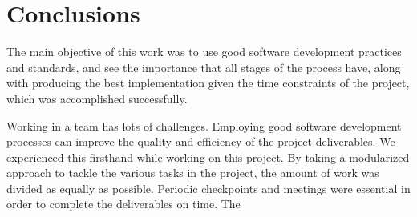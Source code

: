 \documentclass[12pt,a4paper]{article}
\begin{document}
%
%
%
%
%
%
%
%
%
%
%
%
%
%
%
%
%


%			
%
%

\clearpage

\section{Conclusions}

The main objective of this work was to use good software development practices and standards, and see the importance that all stages of the process have, along with producing the best implementation given the time constraints of the project, which was accomplished successfully. 

Working in a team has lots of challenges. Employing good software development processes can improve the quality and efficiency of the project deliverables. We experienced this firsthand while working on this project. By taking a modularized approach to tackle the various tasks in the project, the amount of work was divided as equally as possible. Periodic checkpoints and meetings were essential in order to complete the deliverables on time. The
\end{document}
